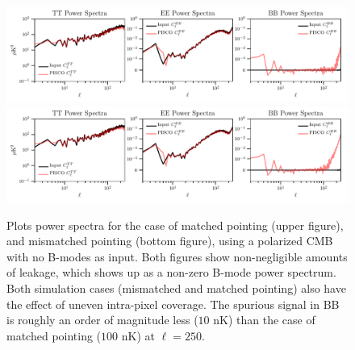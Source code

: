 \documentclass[a4paper,11pt]{article}
\begin{document}
\begin{figure}[!htb]
	\centering
	\includegraphics[width=1\textwidth]{figures/cmb_r0d00_CLASS_matchedPointing_matchedBeams_ellipticalBeams.pdf}
	\includegraphics[width=1\textwidth]{figures/cmb_r0d00_CLASS_mismatchedPointing_matchedBeams_ellipticalBeams.pdf}
	\caption{Plots power spectra for the case of matched pointing (upper figure), and mismatched pointing (bottom figure), using a polarized CMB with no B-modes as input. Both figures show non-negligible amounts of leakage, which shows up as a non-zero B-mode power spectrum. Both simulation cases (mismatched and matched pointing) also have the effect of uneven intra-pixel coverage. The spurious signal in BB is roughly an order of magnitude less ($10$ nK) than the case of matched pointing ($100$ nK) at $\ell = 250$.}
	\label{fig::pisco4class_pointingmismatch}
\end{figure}

\end{document}
